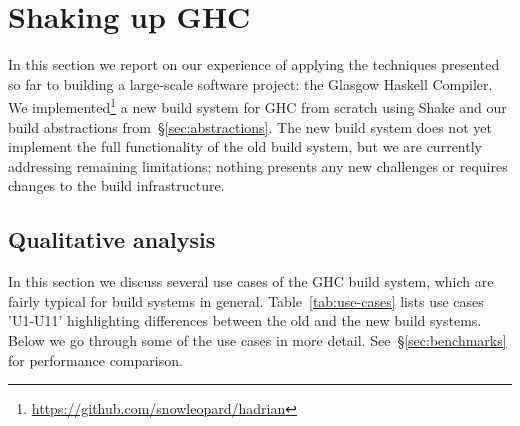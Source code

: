 \section{Shaking up GHC\label{sec:ghc}}

In this section we report on our experience of applying the techniques presented
so far to building a large-scale software project: the Glasgow Haskell Compiler.
We implemented\footnote{\url{https://github.com/snowleopard/hadrian}}
a new build system for GHC from scratch using Shake and our build abstractions
from~\S\ref{sec:abstractions}. The new build system does not yet implement the
full functionality of the old build system, but we are currently addressing
remaining limitations; nothing presents any new challenges or requires changes
to the build infrastructure.

%
%

\subsection{Qualitative analysis\label{sec:use-cases}}

In this section we discuss several use cases of the GHC build system, which
are fairly typical for build systems in general. Table~\ref{tab:use-cases}
lists use cases \lst'U1-U11' highlighting differences between the old and the
new build systems. Below we go through some of the use cases in more detail.
See~\S\ref{sec:benchmarks} for performance comparison.

